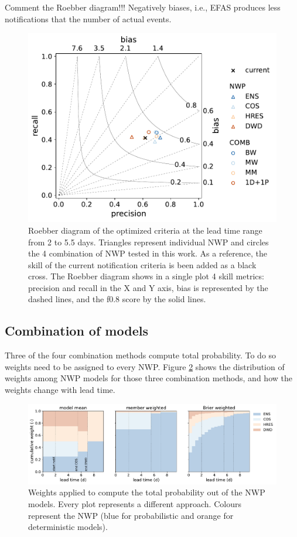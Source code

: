 \documentclass[preprint,12pt]{elsarticle}
\begin{document}
Comment the Roebber diagram!!! Negatively biases, i.e., EFAS produces less notifications that the number of actual events.

\begin{figure}
    \centering
    \includegraphics[width=0.5\linewidth]{figures/roebber_fscore_60h.pdf}
    \caption{Roebber diagram of the optimized criteria at the lead time range from 2 to 5.5 days. Triangles represent individual NWP and circles the 4 combination of NWP tested in this work. As a reference, the skill of the current notification criteria is been added as a black cross. The Roebber diagram shows in a single plot 4 skill metrics: precision and recall in the X and Y axis, bias is represented by the dashed lines, and the f0.8 score by the solid lines.} 
    \label{fig:roebber_NWP}
\end{figure}

\subsection{Combination of models}
\label{sec:results_COMB}

Three of the four combination methods compute total probability. To do so weights need to be assigned to every NWP. Figure \ref{fig:weights} shows the distribution of weights among NWP models for those three combination methods, and how the weights change with lead time.

\begin{figure}
    \centering
    \includegraphics[width=1\textwidth]{figures/weights.pdf}
    \caption{Weights applied to compute the total probability out of the NWP models. Every plot represents a different approach. Colours represent the NWP (blue for probabilistic and orange for deterministic models).}
    \label{fig:weights}
\end{figure}
\end{document}
